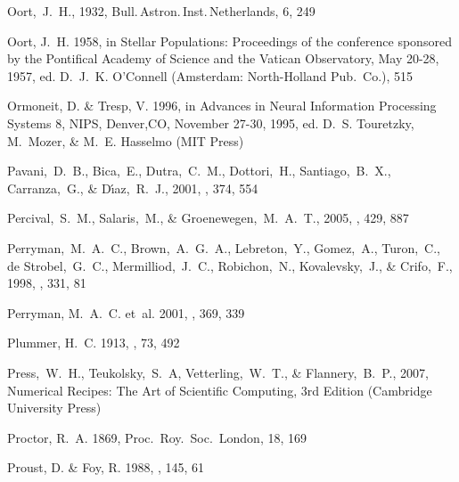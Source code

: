 \begin{thebibliography}{99}
  Oort,~J.~H., 1932,
  Bull.\,Astron.\,Inst.\,Netherlands, 6, 249

{Oort}, J.~H. 1958, in {Stellar Populations: Proceedings of the conference
  sponsored by the Pontifical Academy of Science and the Vatican Observatory,
  May 20-28, 1957}, ed. D.~J.~K. {O'Connell} ({Amsterdam}: {North-Holland
  Pub.~Co.}), 515

{Ormoneit}, D. \& {Tresp}, V. 1996, in {Advances in Neural Information
  Processing Systems 8, NIPS, Denver,CO, November 27-30, 1995}, ed. D.~S.
  {Touretzky}, M.~{Mozer}, \& M.~E. {Hasselmo} (MIT Press)

  Pavani,~D.~B., Bica,~E., Dutra,~C.~M., Dottori,~H., Santiago,~B.~X., Carranza,~G., \& D{\'{\i}}az,~R.~J., 2001,
  \aap, 374, 554

  Percival,~S.~M., Salaris,~M., \& Groenewegen,~M.~A.~T., 2005,
  \aap, 429, 887

  Perryman,~M.~A.~C., Brown,~A.~G.~A., Lebreton,~Y., Gomez,~A., Turon,~C., de Strobel,~G.~C., Mermilliod,~J.~C., Robichon,~N., Kovalevsky,~J., \& Crifo,~F., 1998,
  \aap, 331, 81

{Perryman}, M.~A.~C. {et~al.} 2001, \aap, 369, 339

{Plummer}, H.~C. 1913, \mnras, 73, 492

  Press,~W.~H., Teukolsky,~S.~A, Vetterling,~W.~T., \& Flannery,~B.~P., 2007,
  Numerical Recipes: The Art of Scientific Computing, 3rd Edition (Cambridge University Press)

{Proctor}, R.~A. 1869, Proc.~Roy.~Soc.~London, 18, 169

{Proust}, D. \& {Foy}, R. 1988, \apss, 145, 61


\end{thebibliography}
